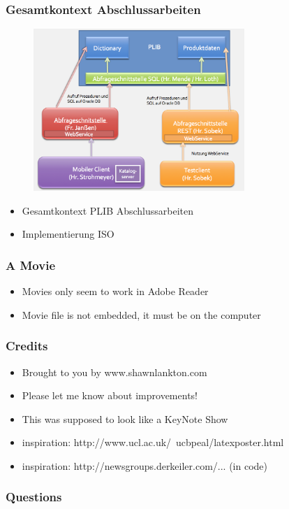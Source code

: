 \documentclass[serif,mathserif]{beamer}
\begin{document}
\begin{frame}
  \frametitle{Gesamtkontext Abschlussarbeiten}
  \begin{figure}[t]
    \includegraphics[width=8cm]{images/gesamtkontext_plib.png}
  \end{figure}
    \begin{itemize}
  \item Gesamtkontext PLIB Abschlussarbeiten
  \item Implementierung ISO
  \end{itemize}
  
\end{frame}

\begin{frame}
  \frametitle{A Movie}
  \begin{center}
  \end{center}
  \begin{itemize}
  \item Movies only seem to work in Adobe Reader
  \item Movie file is not embedded, it must be on the computer
  \end{itemize}
\end{frame}


\begin{frame}
  \frametitle{Credits}
  \begin{itemize}
  \item Brought to you by www.shawnlankton.com
  \item Please let me know about improvements!
  \item This was supposed to look like a KeyNote Show
  \item inspiration: http://www.ucl.ac.uk/~ucbpeal/latexposter.html
  \item inspiration: http://newsgroups.derkeiler.com/... (in code)
  \end{itemize}
\end{frame}

\begin{frame}
  \frametitle{Questions}
\end{frame}
\end{document}
